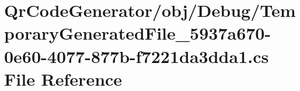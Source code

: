 \hypertarget{_qr_code_generator_2obj_2_debug_2_temporary_generated_file__5937a670-0e60-4077-877b-f7221da3dda1_8cs}{}\section{Qr\+Code\+Generator/obj/\+Debug/\+Temporary\+Generated\+File\+\_\+5937a670-\/0e60-\/4077-\/877b-\/f7221da3dda1.cs File Reference}
\label{_qr_code_generator_2obj_2_debug_2_temporary_generated_file__5937a670-0e60-4077-877b-f7221da3dda1_8cs}
